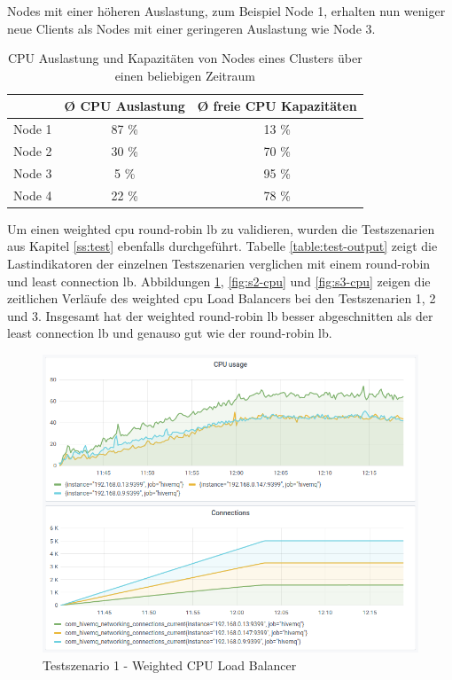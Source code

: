 Nodes mit einer höheren Auslastung, zum Beispiel Node 1, erhalten nun weniger neue Clients als Nodes mit einer geringeren Auslastung wie Node 3.
\\
\begin{table}[h!]
\centering
\renewcommand{\arraystretch}{1.5}
\begin{tabular}{|l|c|c|}
    \hline
    & \textbf{Ø CPU Auslastung} & \textbf{Ø freie CPU Kapazitäten} \\
    \hline
    \hline
    Node 1 & 87 \% & 13 \% \\
    \hline
    Node 2 & 30 \% & 70 \% \\
    \hline
    Node 3 & 5 \% & 95 \% \\
    \hline
    Node 4 & 22 \% & 78 \% \\
    \hline
\end{tabular}
\caption{CPU Auslastung und Kapazitäten von Nodes eines Clusters über einen beliebigen Zeitraum}
\label{table:example-cluster-cpu}
\end{table}
Um einen weighted \ac{cpu} round-robin \acl{lb} zu validieren, wurden die Testszenarien aus Kapitel \ref{ss:test} ebenfalls durchgeführt. Tabelle \ref{table:test-output} zeigt die Lastindikatoren der einzelnen Testszenarien verglichen mit einem round-robin und least connection \ac{lb}. Abbildungen \ref{fig:s1-cpu}, \ref{fig:s2-cpu} und \ref{fig:s3-cpu} zeigen die zeitlichen Verläufe des weighted \ac{cpu} Load Balancers bei den Testszenarien 1, 2 und 3.
Insgesamt hat der weighted round-robin \ac{lb} besser abgeschnitten als der least connection \ac{lb} und genauso gut wie der round-robin \ac{lb}.
\begin{figure}
    \centering
    \includegraphics[scale=0.8]{images/s1_cpu.png}
    \caption{Testszenario 1 - Weighted CPU Load Balancer}
    \label{fig:s1-cpu}
\end{figure}
